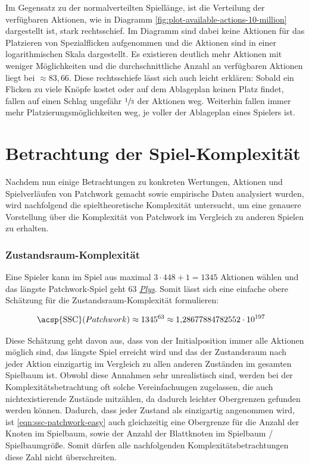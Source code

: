 Im Gegensatz zu der normalverteilten Spiellänge, ist die Verteilung der verfügbaren Aktionen, wie in Diagramm \ref{fig:plot-available-actions-10-million} dargestellt ist, stark rechtsschief. Im Diagramm sind dabei keine Aktionen für das Platzieren von Spezialflicken aufgenommen und die Aktionen sind in einer logarithmischen Skala dargestellt. Es existieren deutlich mehr Aktionen mit weniger Möglichkeiten und die durchschnittliche Anzahl an verfügbaren Aktionen liegt bei ${\approx}83{,}66$. Diese rechtsschiefe lässt sich auch leicht erklären: Sobald ein Flicken zu viele Knöpfe kostet oder auf dem Ablageplan keinen Platz findet, fallen auf einen Schlag ungefähr $\sfrac{1}{3}$ der Aktionen weg. Weiterhin fallen immer mehr Platzierungsmöglichkeiten weg, je voller der Ablageplan eines Spielers ist.

\section{Betrachtung der Spiel-Komplexität}

Nachdem nun einige Betrachtungen zu konkreten Wertungen, Aktionen und Spielverläufen von Patchwork gemacht sowie empirische Daten analysiert wurden, wird nachfolgend die spieltheoretische Komplexität untersucht, um eine genauere Vorstellung über die Komplexität von Patchwork im Vergleich zu anderen Spielen zu erhalten.

\subsubsection*{Zustandsraum-Komplexität}
\label{subsection:zustandsraum-komplexitaet}

Eine Spieler kann im Spiel aus maximal $3 \cdot 448 + 1 = 1345$ Aktionen wählen und das längste Patchwork-Spiel geht 63 \hyperref[text:ply]{\emph{Plys}}. Somit lässt sich eine einfache obere Schätzung für die Zustandsraum-Komplexität formulieren:

\begin{align}
    \label{eqn:ssc-patchwork-easy}
    \text{\acsp{SSC}}(Patchwork) & \approx 1345^{63} \approx 1{,}28677884782552 \cdot 10^{197}
\end{align}

Diese Schätzung geht davon aus, dass von der Initialposition immer alle Aktionen möglich sind, das längste Spiel erreicht wird und das der Zustandsraum nach jeder Aktion einzigartig im Vergleich zu allen anderen Zuständen im gesamten Spielbaum ist. Obwohl diese Annahmen sehr unrealistisch sind, werden bei der Komplexitätsbetrachtung oft solche Vereinfachungen zugelassen, die auch nichtexistierende Zustände mitzählen, da dadurch leichter Obergrenzen gefunden werden können. Dadurch, dass jeder Zustand als einzigartig angenommen wird, ist \ref{eqn:ssc-patchwork-easy} auch gleichzeitig eine Obergrenze für die Anzahl der Knoten im Spielbaum, sowie der Anzahl der Blattknoten im Spielbaum / Spielbaumgröße. Somit dürfen alle nachfolgenden Komplexitätsbetrachtungen diese Zahl nicht überschreiten.

